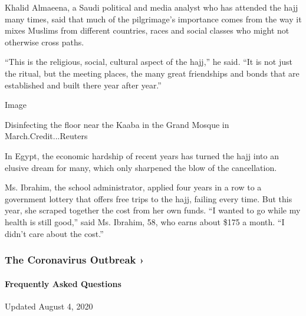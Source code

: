 Khalid Almaeena, a Saudi political and media analyst who has attended
the hajj many times, said that much of the pilgrimage's importance comes
from the way it mixes Muslims from different countries, races and social
classes who might not otherwise cross paths.

``This is the religious, social, cultural aspect of the hajj,'' he said.
``It is not just the ritual, but the meeting places, the many great
friendships and bonds that are established and built there year after
year.''

Image

Disinfecting the floor near the Kaaba in the Grand Mosque in
March.Credit...Reuters

In Egypt, the economic hardship of recent years has turned the hajj into
an elusive dream for many, which only sharpened the blow of the
cancellation.

Ms. Ibrahim, the school administrator, applied four years in a row to a
government lottery that offers free trips to the hajj, failing every
time. But this year, she scraped together the cost from her own funds.
``I wanted to go while my health is still good,'' said Ms. Ibrahim, 58,
who earns about \$175 a month. ``I didn't care about the cost.''

\href{https://www.nytimes.com/news-event/coronavirus?action=click\&pgtype=Article\&state=default\&region=MAIN_CONTENT_3\&context=storylines_faq}{}

\hypertarget{the-coronavirus-outbreak-}{%
\subsubsection{The Coronavirus Outbreak
›}\label{the-coronavirus-outbreak-}}

\hypertarget{frequently-asked-questions}{%
\paragraph{Frequently Asked
Questions}\label{frequently-asked-questions}}

Updated August 4, 2020

